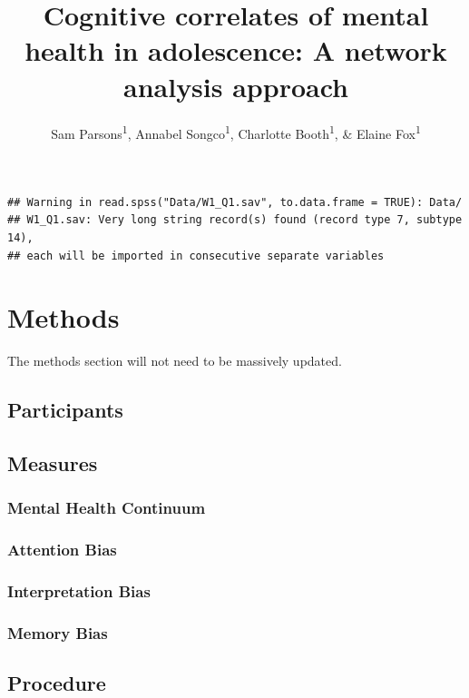 \documentclass[man,floatsintext]{apa6}
\title{Cognitive correlates of mental health in adolescence: A network analysis
approach}
\author{Sam Parsons\textsuperscript{1}, Annabel Songco\textsuperscript{1},
Charlotte Booth\textsuperscript{1}, \& Elaine Fox\textsuperscript{1}}
\date{}
\affiliation{
\vspace{0.5cm}
\textsuperscript{1} University of Oxford}
\begin{document}
\maketitle

\begin{verbatim}
## Warning in read.spss("Data/W1_Q1.sav", to.data.frame = TRUE): Data/
## W1_Q1.sav: Very long string record(s) found (record type 7, subtype 14),
## each will be imported in consecutive separate variables
\end{verbatim}

\section{Methods}\label{methods}

The methods section will not need to be massively updated.

\subsection{Participants}\label{participants}

\subsection{Measures}\label{measures}

\subsubsection{Mental Health Continuum}\label{mental-health-continuum}

\subsubsection{Attention Bias}\label{attention-bias}

\subsubsection{Interpretation Bias}\label{interpretation-bias}

\subsubsection{Memory Bias}\label{memory-bias}

\subsection{Procedure}\label{procedure}
\end{document}
